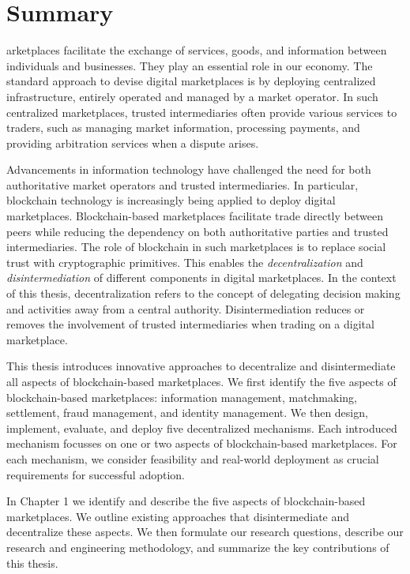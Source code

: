 \chapter*{Summary}

arketplaces facilitate the exchange of services, goods, and information between individuals and businesses.
They play an essential role in our economy.
The standard approach to devise digital marketplaces is by deploying centralized infrastructure, entirely operated and managed by a market operator.
In such centralized marketplaces, trusted intermediaries often provide various services to traders, such as managing market information, processing payments, and providing arbitration services when a dispute arises.

Advancements in information technology have challenged the need for both authoritative market operators and trusted intermediaries.
In particular, blockchain technology is increasingly being applied to deploy digital marketplaces.
Blockchain-based marketplaces facilitate trade directly between peers while reducing the dependency on both authoritative parties and trusted intermediaries.
The role of blockchain in such marketplaces is to replace social trust with cryptographic primitives.
This enables the \emph{decentralization} and \emph{disintermediation} of different components in digital marketplaces.
In the context of this thesis, decentralization refers to the concept of delegating decision making and activities away from a central authority.
Disintermediation reduces or removes the involvement of trusted intermediaries when trading on a digital marketplace.

This thesis introduces innovative approaches to decentralize and disintermediate all aspects of blockchain-based marketplaces.
We first identify the five aspects of blockchain-based marketplaces: information management, matchmaking, settlement, fraud management, and identity management.
We then design, implement, evaluate, and deploy five decentralized mechanisms.
Each introduced mechanism focusses on one or two aspects of blockchain-based marketplaces.
For each mechanism, we consider feasibility and real-world deployment as crucial requirements for successful adoption.

In Chapter 1 we identify and describe the five aspects of blockchain-based marketplaces.
We outline existing approaches that disintermediate and decentralize these aspects.
We then formulate our research questions, describe our research and engineering methodology, and summarize the key contributions of this thesis.

